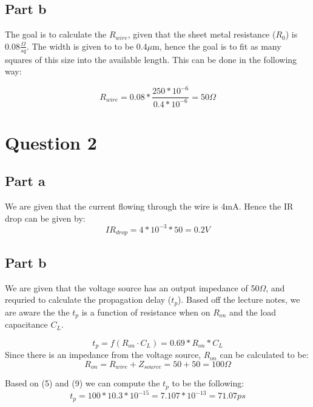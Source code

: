 \documentclass{article}
\begin{document}
\subsection*{Part b}
The goal is to calculate the $R_{wire}$, given that the sheet metal resistance ($R_{0}$) is 0.08$\frac{\Omega}{sq}$.
The width is given to to be 0.4$\mu$m, hence the goal is to fit as many squares of this size into the available length.
This can be done in the following way:

\begin{equation}
    R_{wire} = 0.08 * \frac{250 * 10^{-6}}{0.4 * 10^{-6}} = 50\Omega
\end{equation}

\section*{Question 2}
\subsection*{Part a}
We are given that the current flowing through the wire is 4mA. Hence the IR drop can be given by:
\begin{equation}
    IR_{drop} = 4 * 10^{-3} * 50 = 0.2 V
\end{equation}

\subsection*{Part b}
We are given that the voltage source has an output impedance of 50$\Omega$, and requried to calculate the propagation delay ($t_{p}$).
Based off the lecture notes, we are aware the the $t_{p}$ is a function of resistance when on $R_{on}$ and the load capacitance $C_{L}$.

\begin{equation}
    t_{p} = f(R_{on} \cdot C_{L}) = 0.69 * R_{on} * C_{L}
\end{equation}
Since there is an impedance from the voltage source, $R_{on}$ can be calculated to be:
\begin{equation}
    R_{on} = R_{wire} + Z_{source} = 50 + 50 = 100\Omega
\end{equation}

Based on (5) and (9) we can compute the $t_{p}$ to be the following:
\begin{equation}
    t_{p} = 100 * 10.3 * 10^{-15} = 7.107 * 10^{-13} = 71.07ps
\end{equation}
\end{document}
